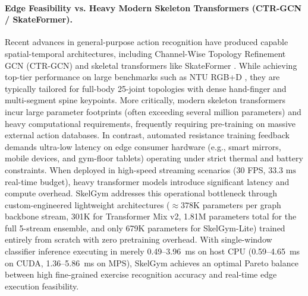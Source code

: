 \documentclass[preprint,12pt]{elsarticle}
\begin{document}
\paragraph{Edge Feasibility vs. Heavy Modern Skeleton Transformers (CTR-GCN / SkateFormer).}
Recent advances in general-purpose action recognition have produced capable spatial-temporal architectures, including Channel-Wise Topology Refinement GCN (CTR-GCN) \cite{chen2021channel} and skeletal transformers like SkateFormer \cite{zheng2024skateformer}. While achieving top-tier performance on large benchmarks such as NTU RGB+D \cite{shahroudy2016}, they are typically tailored for full-body 25-joint topologies with dense hand-finger and multi-segment spine keypoints. More critically, modern skeleton transformers incur large parameter footprints (often exceeding several million parameters) and heavy computational requirements, frequently requiring pre-training on massive external action databases.
In contrast, automated resistance training feedback demands ultra-low latency on edge consumer hardware (e.g., smart mirrors, mobile devices, and gym-floor tablets) operating under strict thermal and battery constraints. When deployed in high-speed streaming scenarios (30 FPS, $33.3\text{ ms}$ real-time budget), heavy transformer models introduce significant latency and compute overhead. SkelGym addresses this operational bottleneck through custom-engineered lightweight architectures ($\approx 378\text{K}$ parameters per graph backbone stream, 301K for Transformer Mix v2, 1.81M parameters total for the full 5-stream ensemble, and only 679K parameters for SkelGym-Lite) trained entirely from scratch with zero pretraining overhead. With single-window classifier inference executing in merely 0.49--3.96~ms on host CPU (0.59--4.65~ms on CUDA, 1.36--5.86~ms on MPS), SkelGym achieves an optimal Pareto balance between high fine-grained exercise recognition accuracy and real-time edge execution feasibility.
\end{document}

